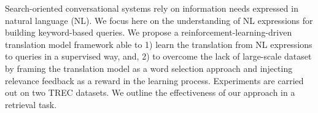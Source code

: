 Search-oriented conversational systems rely on information needs expressed in natural language (NL). We focus here on the understanding of NL expressions for building keyword-based queries. We propose a  reinforcement-learning-driven translation model framework  able to 1) learn the translation from NL expressions to queries in a supervised way, and, 2) to overcome the lack of large-scale dataset by framing the translation model as a word selection approach and injecting relevance feedback as a reward in the learning process. Experiments are carried out on two TREC datasets. We outline the effectiveness of our approach in a retrieval task.
